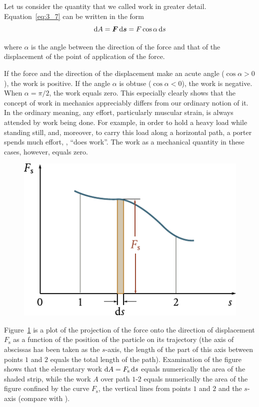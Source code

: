 Let us consider the quantity that we called work in greater detail. Equation~\eqref{eq:3_7} can be written in the form
\begin{equation}\label{eq:3_12}
\mathrm{d}A = \boldsymbol{F}\,\mathrm{d}\boldsymbol{s} = F\cos\alpha\,\mathrm{d} s
\end{equation}

\noindent
where $\alpha$ is the angle between the direction of the force and that of the displacement of the point of application of the force.

If the force and the direction of the displacement make an
acute angle ($\cos\alpha>0$), the work is positive. If the angle $\alpha$ is obtuse ($\cos\alpha<0$), the work is negative. When $\alpha=\pi/2$, the work equals zero. This especially clearly shows that the concept of work in mechanics appreciably differs from our ordinary notion of it. In the ordinary meaning, any effort, particularly muscular strain, is always attended by work being done. For example, in order to hold a heavy load while standing still, and, moreover, to carry this load along a horizontal path, a porter spends much effort, \ie, ``does work''. The work as a mechanical quantity in these cases, however, equals zero.

\begin{figure}[t]
	\begin{center}
		\includegraphics[scale=1]{figures/ch_03/fig_3_1.pdf}
		\caption[]{}
		\label{fig:3_1}
	\end{center}
	\vspace{-0.7cm}
\end{figure}

Figure~\ref{fig:3_1} is a plot of the projection of the force onto the direction of displacement $F_{\text{s}}$ as a function of the position of the particle on its trajectory (the axis of abscissas has been taken as the $s$-axis, the length of the part of this axis between points $1$ and $2$ equals the total length of the path). Examination of the figure shows that the elementary work $\mathrm{d} A=F_{\text{s}}\,\mathrm{d} s$ equals numerically the area of the shaded strip, while the work $A$ over path $1$-$2$ equals numerically the area of the figure confined by the curve $F_{\text{s}}$, the vertical lines from points $1$ and $2$ and the $s$-axis (compare with ).

